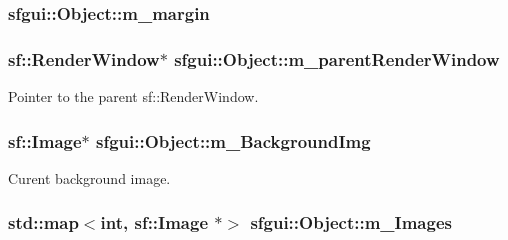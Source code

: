 \hypertarget{classsfgui_1_1Object_b7afeee103f0cfc0c045effa8527a4b4}{
\subsubsection[m\_\-margin]{ {\bf sfgui::Object::m\_\-margin}}}
\label{classsfgui_1_1Object_b7afeee103f0cfc0c045effa8527a4b4}


\hypertarget{classsfgui_1_1Object_518ad23f1c9aab6fd9b346d708c503a8}{
\subsubsection[m\_\-parentRenderWindow]{\setlength{\rightskip}{0pt plus 5cm}sf::RenderWindow$\ast$ {\bf sfgui::Object::m\_\-parentRenderWindow}}}
\label{classsfgui_1_1Object_518ad23f1c9aab6fd9b346d708c503a8}


Pointer to the parent sf::RenderWindow. 

\hypertarget{classsfgui_1_1Object_08225eee55352c02435d14e1bce24dbe}{
\subsubsection[m\_\-BackgroundImg]{\setlength{\rightskip}{0pt plus 5cm}sf::Image$\ast$ {\bf sfgui::Object::m\_\-BackgroundImg}}}
\label{classsfgui_1_1Object_08225eee55352c02435d14e1bce24dbe}


Curent background image. 

\hypertarget{classsfgui_1_1Object_6d7907f767742dcfd37c1b0c349daa2d}{
\subsubsection[m\_\-Images]{\setlength{\rightskip}{0pt plus 5cm}std::map$<$int, sf::Image $\ast$$>$ {\bf sfgui::Object::m\_\-Images}}}
\label{classsfgui_1_1Object_6d7907f767742dcfd37c1b0c349daa2d}


